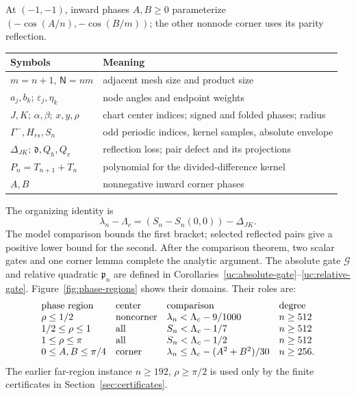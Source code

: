 At $(-1,-1)$, inward phases $A,B\geq0$ parameterize
$(-\cos(A/n),-\cos(B/m))$; the other nonnode corner uses its parity reflection.

\begin{center}\small
\begin{tabular}{@{}ll@{}}\toprule
Symbols & Meaning\\\midrule
$m=n+1$, $\mathsf N=nm$ & adjacent mesh size and product size\\
$a_j,b_k$; $\varepsilon_j,\eta_k$ & node angles and endpoint weights\\
$J,K$; $\alpha,\beta$; $x,y,\rho$ & chart center indices; signed and folded phases; radius\\
$\Gamma^-,H_{rs},S_n$ & odd periodic indices, kernel samples, absolute envelope\\
$\Delta_{JK}$; $\mathfrak d,Q_h,Q_v$ & reflection loss; pair defect and its projections\\
$P_n=T_{n+1}+T_n$ & polynomial for the divided-difference kernel\\
$A,B$ & nonnegative inward corner phases\\\bottomrule
\end{tabular}
\end{center}

The organizing identity is
\[
 \lambda_n-\Lambda_c=(S_n-S_n(0,0))-\Delta_{JK}.
\]
The model comparison bounds the first bracket; selected reflected
pairs give a positive lower bound for the second. After the comparison
theorem, two scalar gates and one corner lemma complete the analytic
argument.
The absolute gate $\mathcal G$ and relative quadratic $\mathfrak p_n$
are defined in Corollaries~\ref{uc:absolute-gate}--\ref{uc:relative-gate}.
Figure~\ref{fig:phase-regions} shows their domains. Their roles are:
\[
\begin{array}{l@{\quad}l@{\quad}l@{\quad}l}
\text{phase region}&\text{center}&\text{comparison}&\text{degree}\\
\rho\leq1/2&\text{noncorner}&\lambda_n<\Lambda_c-9/1000&n\geq512\\
1/2\leq\rho\leq1&\text{all}&S_n<\Lambda_c-1/7&n\geq512\\
1\leq\rho\leq\pi&\text{all}&S_n<\Lambda_c-1/2&n\geq512\\
0\leq A,B\leq\pi/4&\text{corner}&
 \lambda_n\leq\Lambda_c-(A^2+B^2)/30&n\geq256.
\end{array}
\]
The earlier far-region instance $n\geq192$, $\rho\geq\pi/2$ is
used only by the finite certificates in Section~\ref{sec:certificates}.

